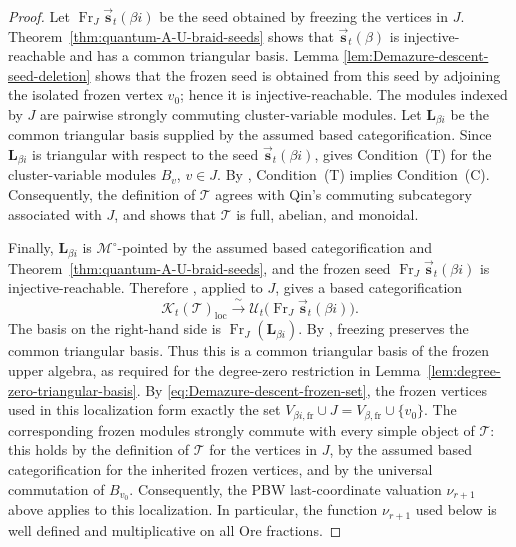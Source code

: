 \documentclass[12pt, reqno]{amsart}
\theoremstyle{plain}
\theoremstyle{definition}
\numberwithin{equation}{section}
\begin{document}
\begin{proof}
Let
\(\operatorname{Fr}_{J}
\overrightarrow{\mathbf s}_t(\beta i)\)
be the seed obtained by freezing the vertices in \(J\).
Theorem~\ref{thm:quantum-A-U-braid-seeds} shows that
\(\overrightarrow{\mathbf s}_t(\beta)\) is injective-reachable and has a
common triangular basis. Lemma
\ref{lem:Demazure-descent-seed-deletion} shows that the frozen seed is
obtained from this seed by adjoining the isolated frozen vertex
\(v_0\); hence it is injective-reachable. The modules indexed by \(J\) are
pairwise strongly commuting cluster-variable modules. Let
\(\mathbf L_{\beta i}\) be the common triangular basis supplied by
the assumed based categorification. Since
\(\mathbf L_{\beta i}\) is triangular with respect to the seed
\(\overrightarrow{\mathbf s}_t(\beta i)\),
\cite[Remark~5.9]{qin2024analogs} gives Condition~\textup{(T)} for
the cluster-variable modules \(B_v\), \(v\in J\). By
\cite[Remark~5.7]{qin2024analogs}, Condition~\textup{(T)} implies
Condition~\textup{(C)}. Consequently, the definition of
\(\mathscr T\) agrees with Qin's commuting subcategory associated
with \(J\), and \cite[Lemmas~5.11--5.12]{qin2024analogs} shows that
\(\mathscr T\) is full, abelian, and monoidal.

Finally, \(\mathbf L_{\beta i}\) is
\(\mathcal M^\circ\)-pointed by the assumed based
categorification and Theorem~\ref{thm:quantum-A-U-braid-seeds}, and the frozen seed $\operatorname{Fr}_{J}
        \overrightarrow{\mathbf s}_t(\beta i)$ is injective-reachable. Therefore
\cite[Theorem~5.17]{qin2024analogs}, applied to \(J\), gives a based
categorification
\begin{equation}\label{eq:Kt-T-frozen-upper}
    \mathcal{K}_t(\mathscr T)_{\mathrm{loc}}
    \xrightarrow{\ \sim\ }
    \mathcal U_t\bigl(
        \operatorname{Fr}_{J}
        \overrightarrow{\mathbf s}_t(\beta i)
    \bigr).
\end{equation}
The basis on the right-hand side is
\(\operatorname{Fr}_{J}(\mathbf L_{\beta i})\). By
\cite[Theorem~3.17]{qin2024analogs}, freezing preserves the common
triangular basis. Thus this is a common triangular basis of the
frozen upper algebra, as required for the degree-zero restriction
in Lemma~\ref{lem:degree-zero-triangular-basis}.
By \eqref{eq:Demazure-descent-frozen-set}, the frozen vertices used in
this localization form exactly the set
\(V_{\beta i,\mathrm{fr}}\cup J
=V_{\beta,\mathrm{fr}}\cup\{v_0\}\).
The corresponding frozen modules strongly commute with every simple
object of \(\mathscr T\): this holds by the definition of
\(\mathscr T\) for the vertices in \(J\), by the assumed based
categorification for the inherited frozen vertices, and by the universal
commutation of \(B_{v_0}\). Consequently,
the PBW last-coordinate valuation $\nu_{r+1}$ above applies to this
localization. In particular, the function \(\nu_{r+1}\) used below
is well defined and multiplicative on all Ore fractions.


\end{proof}
\end{document}
